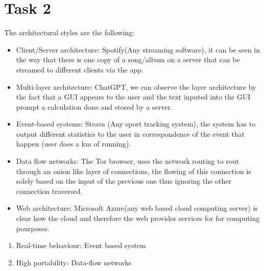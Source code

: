 \chapter{Task 2}
\begin{parlist}
	\item The architectural styles are the following:
	\begin{itemize}
		\item Client/Server architecture: Spotify(Any streaming software), it can be seen in the way that there is one copy of a song/album on a server that can be streamed to different clients via the app.
		\item Multi-layer architecture: ChatGPT, we can observe the layer architecture by the fact that a GUI appears to the user and the text inputed into the GUI prompt a calculation done and stored by a server.
		\item Event-based systems: Strava (Any sport tracking system), the system has to output different statistics to the user in correspondence of the event that happen (user does a km of running).
		\item Data flow networks: The Tor browser, uses the network routing to rout through an onion like layer of connections, the flowing of this connection is solely based on the input of the previous one thus ignoring the other connection traversed. 
		\item Web architecture: Microsoft Azure(any web based cloud computing server) is clear how the cloud and therefore the web provides services for for computing pourposes.
	\end{itemize}
	\item 
	\begin{enumerate}
		\item Real-time behaviour: Event based system
		\item High portability: Data-flow networks
	\end{enumerate}
\end{parlist}